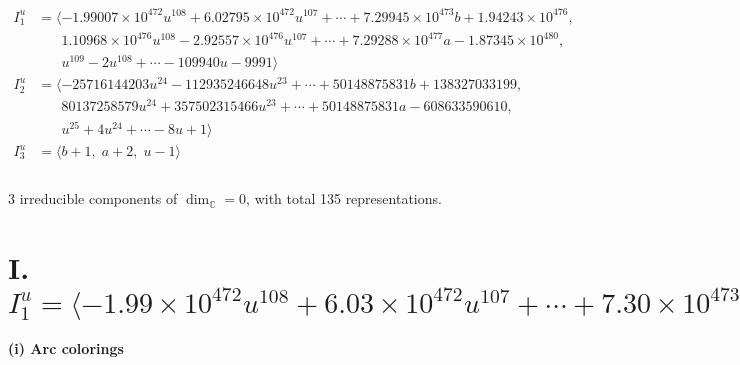 \documentclass[1p]{elsarticle_modified}
\theoremstyle{definition}
\begin{document}
\begin{align*}
I^u_{1}&=\langle 
-1.99007\times10^{472} u^{108}+6.02795\times10^{472} u^{107}+\cdots+7.29945\times10^{473} b+1.94243\times10^{476},\\
\phantom{I^u_{1}}&\phantom{= \langle  }1.10968\times10^{476} u^{108}-2.92557\times10^{476} u^{107}+\cdots+7.29288\times10^{477} a-1.87345\times10^{480},\\
\phantom{I^u_{1}}&\phantom{= \langle  }u^{109}-2 u^{108}+\cdots-109940 u-9991\rangle \\
I^u_{2}&=\langle 
-25716144203 u^{24}-112935246648 u^{23}+\cdots+50148875831 b+138327033199,\\
\phantom{I^u_{2}}&\phantom{= \langle  }80137258579 u^{24}+357502315466 u^{23}+\cdots+50148875831 a-608633590610,\\
\phantom{I^u_{2}}&\phantom{= \langle  }u^{25}+4 u^{24}+\cdots-8 u+1\rangle \\
I^u_{3}&=\langle 
b+1,\;a+2,\;u-1\rangle \\
\\
\end{align*}
\raggedright * 3 irreducible components of $\dim_{\mathbb{C}}=0$, with total 135 representations.\\
\newpage
\renewcommand{\arraystretch}{1}
\centering \section*{I. $I^u_{1}= \langle -1.99\times10^{472} u^{108}+6.03\times10^{472} u^{107}+\cdots+7.30\times10^{473} b+1.94\times10^{476},\;1.11\times10^{476} u^{108}-2.93\times10^{476} u^{107}+\cdots+7.29\times10^{477} a-1.87\times10^{480},\;u^{109}-2 u^{108}+\cdots-109940 u-9991 \rangle$}
\flushleft \textbf{(i) Arc colorings}\\
\end{document}
